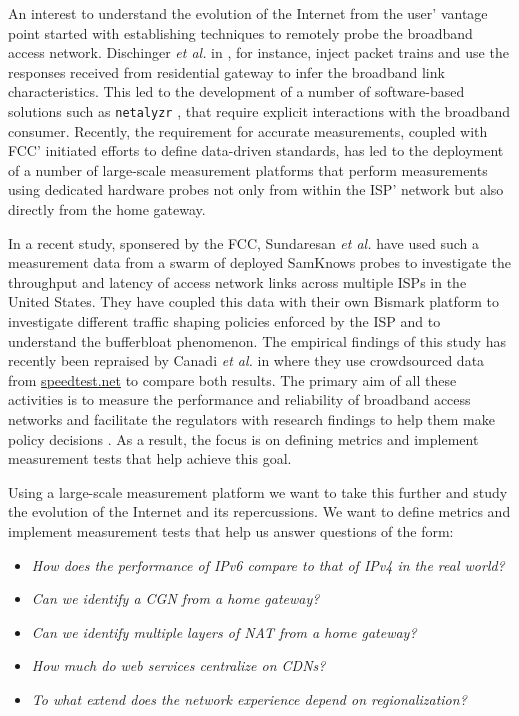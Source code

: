 An interest to understand the evolution of the Internet from the user' vantage
point started with establishing techniques to remotely probe the broadband
access network. Dischinger \emph{et al.} in \cite{dischinger:2007}, for
instance, inject packet trains and use the responses received from residential
gateway to infer the broadband link characteristics. This led to the
development of a number of software-based solutions such as \texttt{netalyzr}
\cite{kreibich:2010}, that require explicit interactions with the broadband
consumer.  Recently, the requirement for accurate measurements, coupled with
\ac{FCC}' initiated efforts to define data-driven standards, has led to the
deployment of a number of large-scale measurement platforms that perform
measurements using dedicated hardware probes not only from within the
\ac{ISP}' network but also directly from the home gateway.

In a recent study, sponsered by the \ac{FCC}, Sundaresan \emph{et al.}
\cite{sundaresan:2011} have used such a measurement data from a swarm of
deployed SamKnows probes to investigate the throughput and latency of access
network links across multiple \ac{ISP}s in the United States. They have
coupled this data with their own Bismark platform \cite{sundaresan:2012} to
investigate different traffic shaping policies enforced by the \ac{ISP} and to
understand the bufferbloat phenomenon. The empirical findings of this study
has recently been repraised by Canadi \emph{et al.} in \cite{canadi:2012}
where they use crowdsourced data from \url{speedtest.net} to compare both
results. The primary aim of all these activities is to measure the performance
and reliability of broadband access networks and facilitate the regulators
with research findings to help them make policy decisions
\cite{draft-schulzrinne-lmap-requirements-00}.  As a result, the focus is on
defining metrics and implement measurement tests that help achieve this goal.

Using a large-scale measurement platform we want to take this further and
study the evolution of the Internet and its repercussions. We want to define
metrics and implement measurement tests that help us answer questions of the
form:

\begin{itemize}
  \item \emph{How does the performance of IPv6 compare to that of IPv4 in the real world?}
  \item \emph{Can we identify a \ac{CGN} from a home gateway?}
  \item \emph{Can we identify multiple layers of NAT from a home gateway?}
  \item \emph{How much do web services centralize on \ac{CDN}s?}
  \item \emph{To what extend does the network experience depend on regionalization?}
\end{itemize}

